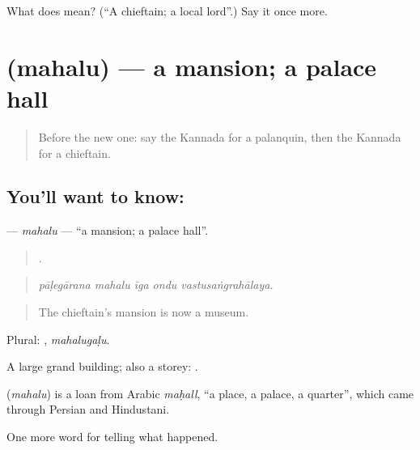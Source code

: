 \begin{tcolorbox}[breakable,colback=teal!4,colframe=teal!35!black,title={Before you move on}]
What does  mean? (\textquotedblleft{}A chieftain; a local lord\textquotedblright{}.) Say it once more.
\end{tcolorbox}
\section[\texorpdfstring{\kn{ಮಹಲು} (mahalu)}{ಮಹಲು (mahalu)}]{ (mahalu) — a mansion; a palace hall}

\label{lesson:KA-C371-mahalu}



\begin{quote}
Before the new one: say the Kannada for a palanquin, then the Kannada for a chieftain.
\end{quote}

\subsection*{You'll want to know: }
\textbf{} — \emph{mahalu} — \textquotedblleft{}a mansion; a palace hall\textquotedblright{}.

\begin{quote}
    .
\end{quote}

\begin{quote}
\emph{pāḷegārana mahalu īga ondu vastusaṅgrahālaya.}
\end{quote}

\begin{quote}
The chieftain's mansion is now a museum.
\end{quote}

Plural: , \emph{mahalugaḷu}.

A large grand building; also a storey:   .

\begin{cousinweb}
\textbf{} (\emph{mahalu}) is a loan from Arabic \emph{maḥall}, \textquotedblleft{}a place, a palace, a quarter\textquotedblright{}, which came through Persian and Hindustani.
\end{cousinweb}

\begin{grammarlens}[title={What you've built}]
One more word for telling what happened.
\end{grammarlens}

